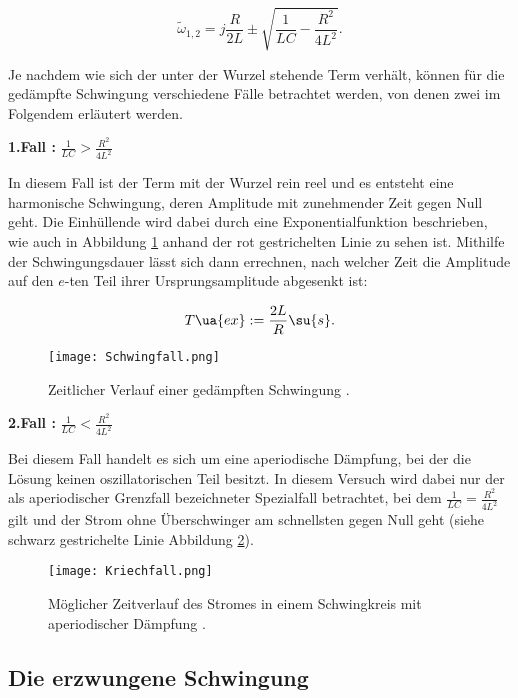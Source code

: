 \begin{equation}
  \label{eqn:omega1,2}
  \tilde{\omega}_{1,2} = j \frac{R}{2L} \pm \sqrt{ \frac{1}{LC} - \frac{R^2}{4L^2}} .
\end{equation}

Je nachdem wie sich der unter der Wurzel stehende Term verhält, können für die
gedämpfte Schwingung verschiedene Fälle betrachtet werden, von denen zwei im Folgendem
erläutert werden.

\textbf{1.Fall :} $\frac{1}{LC} > \frac{R^2}{4L^2}$

In diesem Fall ist der Term mit der Wurzel rein reel und  es entsteht eine
harmonische Schwingung, deren Amplitude mit zunehmender
Zeit gegen Null geht. Die Einhüllende wird dabei durch eine Exponentialfunktion
beschrieben, wie auch in Abbildung \ref{fig:Schwingfall} anhand der rot gestrichelten
Linie zu sehen ist.
Mithilfe der Schwingungsdauer lässt sich dann errechnen, nach welcher
Zeit die Amplitude auf den $e$-ten Teil ihrer Ursprungsamplitude abgesenkt ist:

\begin{equation}
  \label{eqn:T_ex}
  T\ua{ex} := \frac{2L}{R} \su{s} .
\end{equation}

\begin{figure}
  \centering
  \texttt{[image: Schwingfall.png]}
  \caption{Zeitlicher Verlauf einer gedämpften Schwingung \cite{anleitung01}.}
  \label{fig:Schwingfall}
\end{figure}

\textbf{2.Fall :} $\frac{1}{LC} < \frac{R^2}{4L^2}$

Bei diesem Fall handelt es sich um eine aperiodische Dämpfung, bei der die Lösung
keinen oszillatorischen Teil besitzt. In diesem Versuch wird dabei nur der als
aperiodischer Grenzfall bezeichneter Spezialfall betrachtet, bei dem
$\frac{1}{LC} = \frac{R^2}{4L^2}$ gilt und der Strom ohne Überschwinger am schnellsten
gegen Null geht (siehe schwarz gestrichelte Linie Abbildung \ref{fig:Kriechfall}).

\begin{figure}
  \centering
  \texttt{[image: Kriechfall.png]}
  \caption{Möglicher Zeitverlauf des Stromes in einem Schwingkreis mit aperiodischer Dämpfung \cite{anleitung01}.}
  \label{fig:Kriechfall}
\end{figure}

\newpage

\subsection{Die erzwungene Schwingung}

